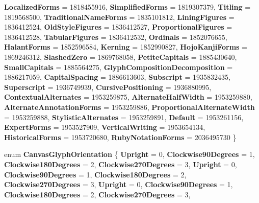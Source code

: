 \begin{DoxyCompactItemize}
\newline
{\bfseries Localized\+Forms} = 1818455916, 
{\bfseries Simplified\+Forms} = 1819307379, 
{\bfseries Titling} = 1819568500, 
{\bfseries Traditional\+Name\+Forms} = 1835101812, 
\newline
{\bfseries Lining\+Figures} = 1836412524, 
{\bfseries Old\+Style\+Figures} = 1836412527, 
{\bfseries Proportional\+Figures} = 1836412528, 
{\bfseries Tabular\+Figures} = 1836412532, 
\newline
{\bfseries Ordinals} = 1852076655, 
{\bfseries Halant\+Forms} = 1852596584, 
{\bfseries Kerning} = 1852990827, 
{\bfseries Hojo\+Kanji\+Forms} = 1869246312, 
\newline
{\bfseries Slashed\+Zero} = 1869768058, 
{\bfseries Petite\+Capitals} = 1885430640, 
{\bfseries Small\+Capitals} = 1885564275, 
{\bfseries Glyph\+Composition\+Decomposition} = 1886217059, 
\newline
{\bfseries Capital\+Spacing} = 1886613603, 
{\bfseries Subscript} = 1935832435, 
{\bfseries Superscript} = 1936749939, 
{\bfseries Cursive\+Positioning} = 1936880995, 
\newline
{\bfseries Contextual\+Alternates} = 1953259875, 
{\bfseries Alternate\+Half\+Width} = 1953259880, 
{\bfseries Alternate\+Annotation\+Forms} = 1953259886, 
{\bfseries Proportional\+Alternate\+Width} = 1953259888, 
\newline
{\bfseries Stylistic\+Alternates} = 1953259891, 
{\bfseries Default} = 1953261156, 
{\bfseries Expert\+Forms} = 1953527909, 
{\bfseries Vertical\+Writing} = 1953654134, 
\newline
{\bfseries Historical\+Forms} = 1953720680, 
{\bfseries Ruby\+Notation\+Forms} = 2036495730
 \}
\item 
\mbox{\label{namespace_microsoft_1_1_graphics_1_1_canvas_1_1_text_a6d01f61e95bc019eb180ac64876b87fe}} 
enum {\bfseries Canvas\+Glyph\+Orientation} \{ \newline
{\bfseries Upright} = 0, 
{\bfseries Clockwise90\+Degrees} = 1, 
{\bfseries Clockwise180\+Degrees} = 2, 
{\bfseries Clockwise270\+Degrees} = 3, 
\newline
{\bfseries Upright} = 0, 
{\bfseries Clockwise90\+Degrees} = 1, 
{\bfseries Clockwise180\+Degrees} = 2, 
{\bfseries Clockwise270\+Degrees} = 3, 
\newline
{\bfseries Upright} = 0, 
{\bfseries Clockwise90\+Degrees} = 1, 
{\bfseries Clockwise180\+Degrees} = 2, 
{\bfseries Clockwise270\+Degrees} = 3, 

\end{DoxyCompactItemize}
